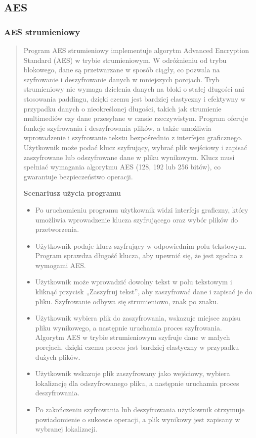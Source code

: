 \documentclass[12pt,a4paper]{article}
\begin{document}
\subsection{AES}
\subsubsection{AES strumieniowy}
\begin{quotation} \noindent Program AES strumieniowy implementuje algorytm Advanced Encryption Standard (AES) w trybie strumieniowym. W odróżnieniu od trybu blokowego, dane są przetwarzane w sposób ciągły, co pozwala na szyfrowanie i deszyfrowanie danych w mniejszych porcjach. Tryb strumieniowy nie wymaga dzielenia danych na bloki o stałej długości ani stosowania paddingu, dzięki czemu jest bardziej elastyczny i efektywny w przypadku danych o nieokreślonej długości, takich jak strumienie multimediów czy dane przesyłane w czasie rzeczywistym. Program oferuje funkcje szyfrowania i deszyfrowania plików, a także umożliwia wprowadzenie i szyfrowanie tekstu bezpośrednio z interfejsu graficznego. Użytkownik może podać klucz szyfrujący, wybrać plik wejściowy i zapisać zaszyfrowane lub odszyfrowane dane w pliku wynikowym. Klucz musi spełniać wymagania algorytmu AES (128, 192 lub 256 bitów), co gwarantuje bezpieczeństwo operacji.\newline

\noindent\textbf{Scenariusz użycia programu}
\begin{itemize}
\item  Po uruchomieniu programu użytkownik widzi interfejs graficzny, który umożliwia wprowadzenie klucza szyfrującego oraz wybór plików do przetworzenia.
\item Użytkownik podaje klucz szyfrujący w odpowiednim polu tekstowym. Program sprawdza długość klucza, aby upewnić się, że jest zgodna z wymogami AES.
\item Użytkownik może wprowadzić dowolny tekst w polu tekstowym i kliknąć przycisk „Zaszyfruj tekst”, aby zaszyfrować dane i zapisać je do pliku. Szyfrowanie odbywa się strumieniowo, znak po znaku.
\item Użytkownik wybiera plik do zaszyfrowania, wskazuje miejsce zapisu pliku wynikowego, a następnie uruchamia proces szyfrowania. Algorytm AES w trybie strumieniowym szyfruje dane w małych porcjach, dzięki czemu proces jest bardziej elastyczny w przypadku dużych plików.
\item Użytkownik wskazuje plik zaszyfrowany jako wejściowy, wybiera lokalizację dla odszyfrowanego pliku, a następnie uruchamia proces deszyfrowania. 
\item Po zakończeniu szyfrowania lub deszyfrowania użytkownik otrzymuje powiadomienie o sukcesie operacji, a plik wynikowy jest zapisany w wybranej lokalizacji.
\end{itemize}
\end{quotation}
\end{document}
